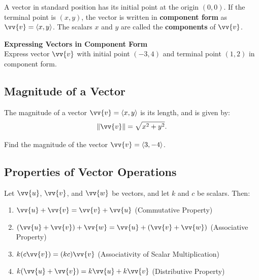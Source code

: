 \documentclass{article}
\begin{document}
A vector in standard position has its initial point at the origin \((0, 0)\). If the terminal point is \((x, y)\), the vector is written in \textbf{component form} as \(\vv{v} = \langle x, y \rangle\). The scalars \(x\) and \(y\) are called the \textbf{components} of \(\vv{v}\).

\begin{exercisebox}
    \textbf{Expressing Vectors in Component Form} \\
    Express vector \(\vv{v}\) with initial point \((-3, 4)\) and terminal point \((1, 2)\) in component form.
\end{exercisebox}

\subsection*{Magnitude of a Vector}

\begin{definitionbox}
    The magnitude of a vector \(\vv{v} = \langle x, y \rangle\) is its length, and is given by:
    \[
    \|\vv{v}\| = \sqrt{x^2 + y^2}.
    \]
\end{definitionbox}

\begin{exercisebox}
    Find the magnitude of the vector \(\vv{v} = \langle 3, -4 \rangle\).
\end{exercisebox}

\subsection*{Properties of Vector Operations}

\begin{theorembox}
    Let \(\vv{u}\), \(\vv{v}\), and \(\vv{w}\) be vectors, and let \(k\) and \(c\) be scalars. Then:
    \begin{enumerate}
        \item \(\vv{u} + \vv{v} = \vv{v} + \vv{u}\) \quad (Commutative Property)
        \item \((\vv{u} + \vv{v}) + \vv{w} = \vv{u} + (\vv{v} + \vv{w})\) \quad (Associative Property)
        \item \(k(c\vv{v}) = (kc)\vv{v}\) \quad (Associativity of Scalar Multiplication)
        \item \(k(\vv{u} + \vv{v}) = k\vv{u} + k\vv{v}\) \quad (Distributive Property)
    \end{enumerate}
\end{theorembox}
\end{document}
